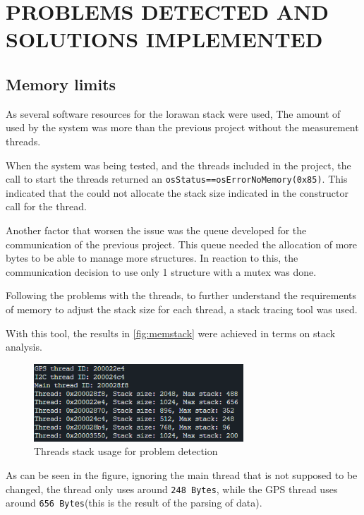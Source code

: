 \section{PROBLEMS DETECTED AND SOLUTIONS IMPLEMENTED}
\label{problems}

\subsection{Memory limits}
As several software resources for the \acrshort{lorawan} stack were used, The amount of  used by the system was more than the previous project without the measurement threads.

When the system was being tested, and the threads included in the project, the call to start the threads returned an \texttt{osStatus==osErrorNoMemory(0x85)}. This indicated that the 
  could not allocate the stack size indicated in the constructor call for the thread.

Another factor that worsen the issue was the queue developed for the communication of the previous project. This queue needed the allocation of 
more bytes to be able to manage more structures. In reaction to this, the communication decision to use only 1 structure with a mutex was done.

Following the problems with the threads, to further understand the requirements of memory to adjust the stack size for each thread, a stack tracing tool was used\cite{Runtimememorystatistics}.

With this tool, the results in \autoref{fig:memstack} were achieved in terms on stack analysis.
\begin{figure}[H]
    \centering
    \includegraphics[width=0.7\textwidth]{images/7/Thread Traced.png}
    \caption{Threads stack usage for problem detection}
    \label{fig:memstack}
\end{figure}

As can be seen in the figure, ignoring the main thread that is not supposed to be changed, the  thread only uses around \texttt{248 Bytes}, while the GPS thread uses around \texttt{656 Bytes}(this is the result of the parsing of  data).

